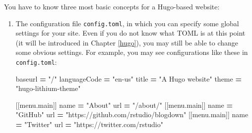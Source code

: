 \documentclass[12pt,]{krantz}
\makeatletter
\newenvironment{Shaded}{\begin{snugshade}}{\end{snugshade}}
\newcommand{\StringTok}[1]{\textcolor[rgb]{0.31,0.60,0.02}{#1}}
\newcommand{\VariableTok}[1]{\textcolor[rgb]{0.00,0.00,0.00}{#1}}
\newcommand{\OperatorTok}[1]{\textcolor[rgb]{0.81,0.36,0.00}{\textbf{#1}}}
\newcommand{\AttributeTok}[1]{\textcolor[rgb]{0.77,0.63,0.00}{#1}}
\newcommand{\NormalTok}[1]{#1}
\newenvironment{kframe}{%
\medskip{}
\setlength{\fboxsep}{.8em}
 \def\at@end@of@kframe{}%
 \ifinner\ifhmode%
  \def\at@end@of@kframe{\end{minipage}}%
  \begin{minipage}{\columnwidth}%
 \fi\fi%
 \def\FrameCommand##1{\hskip\@totalleftmargin \hskip-\fboxsep
 \colorbox{shadecolor}{##1}\hskip-\fboxsep
     \hskip-\linewidth \hskip-\@totalleftmargin \hskip\columnwidth}%
 \MakeFramed {\advance\hsize-\width
   \@totalleftmargin\z@ \linewidth\hsize
   \@setminipage}}%
 {\par\unskip\endMakeFramed%
 \at@end@of@kframe}
\renewenvironment{Shaded}{\begin{kframe}}{\end{kframe}}
\theoremstyle{definition}
\theoremstyle{definition}
\theoremstyle{definition}
\theoremstyle{remark}
\makeatother
\begin{document}
You have to know three most basic concepts for a Hugo-based website:

\begin{enumerate}
\def\labelenumi{\arabic{enumi}.}
\item
  The configuration file \texttt{config.toml}, in
  which you can specify some global settings for your site. Even if you
  do not know what TOML is at this point (it will be introduced in
  Chapter \ref{hugo}), you may still be able to change some obvious
  settings. For example, you may see configurations like these in
  \texttt{config.toml}:

\begin{Shaded}
\begin{Highlighting}[]
\NormalTok{baseurl }\OperatorTok{=} \StringTok{"/"}
\NormalTok{languageCode }\OperatorTok{=} \StringTok{"en-us"}
\NormalTok{title }\OperatorTok{=} \StringTok{"A Hugo website"}
\NormalTok{theme }\OperatorTok{=} \StringTok{"hugo-lithium-theme"}

\NormalTok{[[}\VariableTok{menu}\NormalTok{.}\AttributeTok{main}\NormalTok{]]}
\NormalTok{    name }\OperatorTok{=} \StringTok{"About"}
\NormalTok{    url }\OperatorTok{=} \StringTok{"/about/"}
\NormalTok{[[}\VariableTok{menu}\NormalTok{.}\AttributeTok{main}\NormalTok{]]}
\NormalTok{    name }\OperatorTok{=} \StringTok{"GitHub"}
\NormalTok{    url }\OperatorTok{=} \StringTok{"https://github.com/rstudio/blogdown"}
\NormalTok{[[}\VariableTok{menu}\NormalTok{.}\AttributeTok{main}\NormalTok{]]}
\NormalTok{    name }\OperatorTok{=} \StringTok{"Twitter"}
\NormalTok{    url }\OperatorTok{=} \StringTok{"https://twitter.com/rstudio"}
\end{Highlighting}
\end{Shaded}


\end{enumerate}
\end{document}
